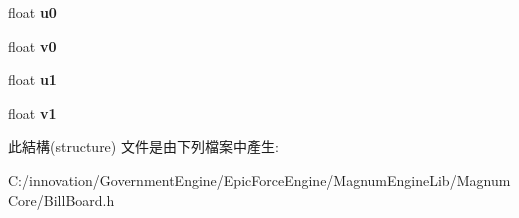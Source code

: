 \begin{DoxyCompactItemize}
\item 
float {\bfseries u0}\hypertarget{struct_i_dream_sky_1_1_bill_board_1_1_vertex_a1aa85fb44d50958d5574e6512df53c06}{}\label{struct_i_dream_sky_1_1_bill_board_1_1_vertex_a1aa85fb44d50958d5574e6512df53c06}

\item 
float {\bfseries v0}\hypertarget{struct_i_dream_sky_1_1_bill_board_1_1_vertex_aa955f188ab070b149d50164b11f6698c}{}\label{struct_i_dream_sky_1_1_bill_board_1_1_vertex_aa955f188ab070b149d50164b11f6698c}

\item 
float {\bfseries u1}\hypertarget{struct_i_dream_sky_1_1_bill_board_1_1_vertex_abf4e50b7fa96c5310c44576ef214dae6}{}\label{struct_i_dream_sky_1_1_bill_board_1_1_vertex_abf4e50b7fa96c5310c44576ef214dae6}

\item 
float {\bfseries v1}\hypertarget{struct_i_dream_sky_1_1_bill_board_1_1_vertex_a10871b4579b5509fbc5ad2d98dccf4db}{}\label{struct_i_dream_sky_1_1_bill_board_1_1_vertex_a10871b4579b5509fbc5ad2d98dccf4db}

\end{DoxyCompactItemize}


此結構(structure) 文件是由下列檔案中產生\+:\begin{DoxyCompactItemize}
\item 
C\+:/innovation/\+Government\+Engine/\+Epic\+Force\+Engine/\+Magnum\+Engine\+Lib/\+Magnum\+Core/Bill\+Board.\+h\end{DoxyCompactItemize}
